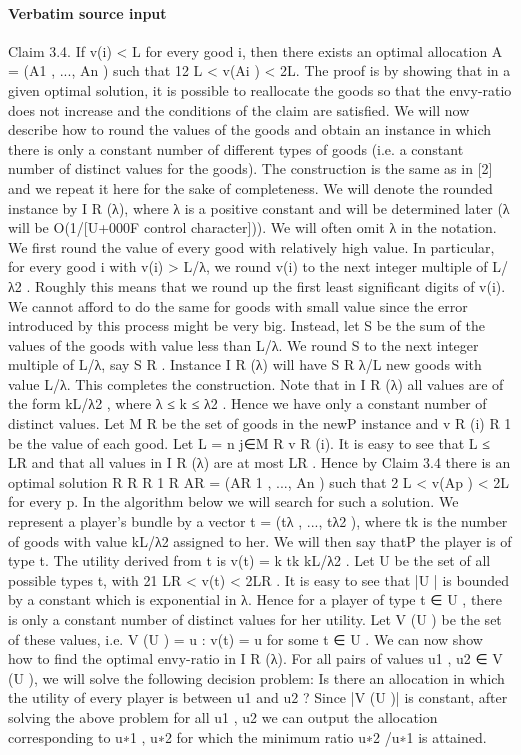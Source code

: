 \documentclass[10pt]{article}
\begin{document}
\paragraph{Verbatim source input}
\begin{ReviewVerbatim}
Claim 3.4. If v(i) < L for every good i, then there exists an optimal allocation A = (A1 , ..., An ) such that 12 L <
v(Ai ) < 2L.
The proof is by showing that in a given optimal solution, it
is possible to reallocate the goods so that the envy-ratio does
not increase and the conditions of the claim are satisfied.
We will now describe how to round the values of the goods
and obtain an instance in which there is only a constant
number of different types of goods (i.e. a constant number of
distinct values for the goods). The construction is the same
as in [2] and we repeat it here for the sake of completeness.
We will denote the rounded instance by I R (λ), where λ is
a positive constant and will be determined later (λ will be
O(1/[U+000F control character])). We will often omit λ in the notation.
We first round the value of every good with relatively high
value. In particular, for every good i with v(i) > L/λ, we
round v(i) to the next integer multiple of L/λ2 . Roughly
this means that we round up the first least significant digits
of v(i). We cannot afford to do the same for goods with
small value since the error introduced by this process might
be very big. Instead, let S be the sum of the values of
the goods with value less than L/λ. We round S to the
next integer multiple of L/λ, say S R . Instance I R (λ) will
have S R λ/L new goods with value L/λ. This completes the
construction. Note that in I R (λ) all values are of the form
kL/λ2 , where λ ≤ k ≤ λ2 . Hence we have only a constant
number of distinct values.
Let M R be the set of goods in the newP
instance and v R (i)
R
1
be the value of each good. Let L = n j∈M R v R (i). It is
easy to see that L ≤ LR and that all values in I R (λ) are at
most LR . Hence by Claim 3.4 there is an optimal solution
R
R
R
1 R
AR = (AR
1 , ..., An ) such that 2 L < v(Ap ) < 2L for every
p. In the algorithm below we will search for such a solution.
We represent a player’s bundle by a vector t = (tλ , ..., tλ2 ),
where tk is the number of goods with value kL/λ2 assigned
to her. We will then say thatP
the player is of type t. The
utility derived from t is v(t) = k tk kL/λ2 . Let U be the set
of all possible types t, with 21 LR < v(t) < 2LR . It is easy to
see that |U | is bounded by a constant which is exponential in
λ. Hence for a player of type t ∈ U , there is only a constant
number of distinct values for her utility. Let V (U ) be the set
of these values, i.e. V (U ) = {u : v(t) = u for some t ∈ U }.
We can now show how to find the optimal envy-ratio in
I R (λ). For all pairs of values u1 , u2 ∈ V (U ), we will solve
the following decision problem: Is there an allocation in
which the utility of every player is between u1 and u2 ? Since
|V (U )| is constant, after solving the above problem for all
u1 , u2 we can output the allocation corresponding to u∗1 , u∗2
for which the minimum ratio u∗2 /u∗1 is attained.
\end{ReviewVerbatim}
\end{document}
